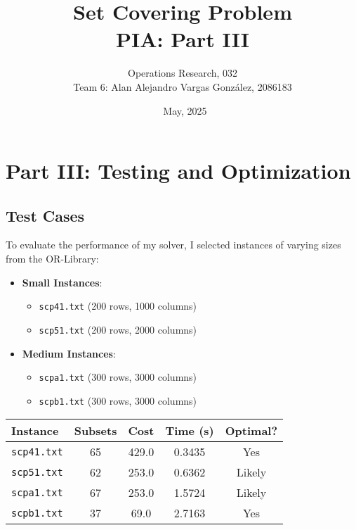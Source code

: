 \documentclass[12pt]{article}
\title{Set Covering Problem\\\large PIA: Part III}
\author{Operations Research, 032\\\large Team 6: Alan Alejandro Vargas González, 2086183}
\date{\ May, 2025}
\begin{document}
\maketitle

\section{Part III: Testing and Optimization}

\subsection{Test Cases}
To evaluate the performance of my solver, I selected instances of varying sizes from the OR-Library:

\begin{itemize}
    \item \textbf{Small Instances}:
    \begin{itemize}
        \item \texttt{scp41.txt} (200 rows, 1000 columns)
        \item \texttt{scp51.txt} (200 rows, 2000 columns)
    \end{itemize}
    
    \item \textbf{Medium Instances}:
    \begin{itemize}
        \item \texttt{scpa1.txt} (300 rows, 3000 columns)
        \item \texttt{scpb1.txt} (300 rows, 3000 columns)
    \end{itemize}
\end{itemize}

\begin{table}[H]
\centering
\label{tab:results}
\begin{tabular}{|l|c|c|c|c|}
\hline
\textbf{Instance} & \textbf{Subsets} & \textbf{Cost} & \textbf{Time (s)} & \textbf{Optimal?} \\ \hline
\texttt{scp41.txt} & 65 & 429.0 & 0.3435 & Yes \cite{beasley1987} \\ \hline
\texttt{scp51.txt} & 62 & 253.0 & 0.6362 & Likely \\ \hline
\texttt{scpa1.txt} & 67 & 253.0 & 1.5724 & Likely \\ \hline
\texttt{scpb1.txt} & 37 & 69.0 & 2.7163 & Yes \cite{beasley1987} \\ \hline
\end{tabular}
\end{table}
\end{document}
